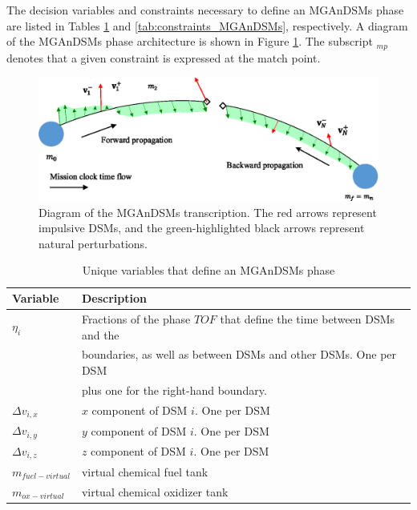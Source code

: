 The decision variables and constraints necessary to define an \ac{MGAnDSMs} phase are listed in Tables \ref{tab:decision_variables_MGAnDSMs} and \ref{tab:constraints_MGAnDSMs}, respectively. A diagram of the \ac{MGAnDSMs} phase architecture is shown in Figure \ref{fig:MGAnDSMs}. The subscript $_{mp}$ denotes that a given constraint is expressed at the match point.

\begin{figure}
	\centering
	\includegraphics[width=0.8\linewidth]{./mission/MGAnDSMsphase_no_legend.eps}
	\caption{\label{fig:MGAnDSMs} Diagram of the \ac{MGAnDSMs} transcription. The red arrows represent impulsive \ac{DSM}s, and the green-highlighted black arrows represent natural perturbations.}
\end{figure}

\begin{table}
	\centering
	\caption{Unique variables that define an \ac{MGAnDSMs} phase}
	\label{tab:decision_variables_MGAnDSMs}
	\begin{tabular}{ll}
		\hline\hline
		Variable & Description\\
		\hline
		$\eta_i$ &Fractions of the phase $TOF$ that define the time between \ac{DSM}s and the\\
		& boundaries, as well as between \ac{DSM}s and other \ac{DSM}s. One per \ac{DSM}\\
		& plus one for the right-hand boundary.\\
		$\Delta v_{i,x}$ & $x$ component of \ac{DSM} $i$. One per \ac{DSM}\\
		$\Delta v_{i,y}$ & $y$ component of \ac{DSM} $i$. One per \ac{DSM}\\
		$\Delta v_{i,z}$ & $z$ component of \ac{DSM} $i$. One per \ac{DSM}\\
		$m_{fuel-virtual}$ & virtual chemical fuel tank\\
		$m_{ox-virtual}$ & virtual chemical oxidizer tank\\
		\hline\hline		
	\end{tabular}
\end{table}

